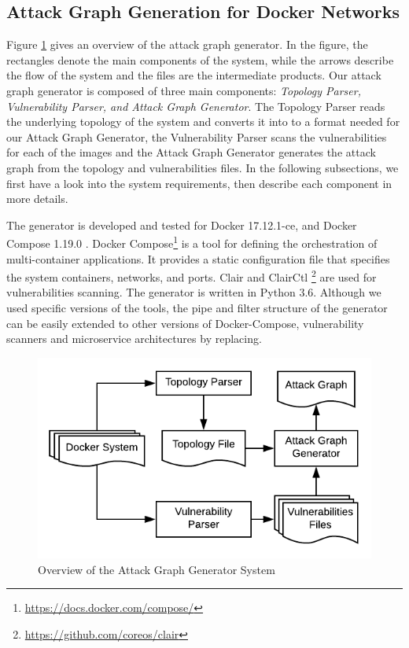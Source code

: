 \subsection{Attack Graph Generation for Docker Networks}
\label{chap:technical}

 Figure \ref{AttackGraphSystem} gives an overview of the attack graph generator. In the figure, the rectangles denote the main components of the system, while the arrows describe the flow of the system and the files are the intermediate products. Our attack graph generator is composed of three main components: \textit{Topology Parser, Vulnerability Parser, and Attack Graph Generator}. The Topology Parser reads the underlying topology of the system and converts it into to a format needed for our Attack Graph Generator, the Vulnerability Parser scans the vulnerabilities for each of the images and the Attack Graph Generator generates the attack graph from the topology and vulnerabilities files. In the following subsections, we first have a look into the system requirements, then describe each component in more details.

The generator is developed and tested for Docker 17.12.1-ce, and Docker Compose 1.19.0 \cite{merkel2014docker}. Docker Compose\footnote{\url{https://docs.docker.com/compose/}} is a tool for defining the orchestration of  multi-container applications. It provides a static configuration file that specifies the system containers, networks, and ports. Clair and ClairCtl \footnote{\url{https://github.com/coreos/clair}}  are used for vulnerabilities scanning. The generator is written in Python 3.6. Although we used  specific versions of the tools, the pipe and filter structure of the generator can be easily extended to other versions of Docker-Compose, vulnerability scanners and microservice architectures by replacing.


\begin{figure}
	\includegraphics[scale=0.9]{./images/AttackGraphSystem}
	\caption{Overview of the Attack Graph Generator System}
	\label{AttackGraphSystem}
\end{figure}

